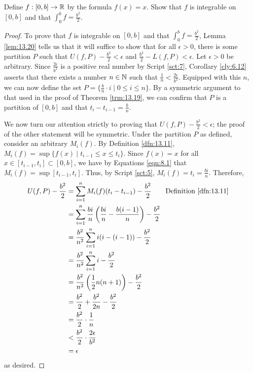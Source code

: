\documentclass[../main.tex]{subfiles}
\begin{document}
\begin{exercise}\label{exr:13.21}
    Define $f:[0,b]\to\mathbb{R}$ by the formula $f(x)=x$. Show that $f$ is integrable on $[0,b]$ and that $\int_0^bf=\frac{b^2}{2}$.
    \begin{proof}
        To prove that $f$ is integrable on $[0,b]$ and that $\int_0^bf=\frac{b^2}{2}$, Lemma \ref{lem:13.20} tells us that it will suffice to show that for all $\epsilon>0$, there is some partition $P$ such that $U(f,P)-\frac{b^2}{2}<\epsilon$ and $\frac{b^2}{2}-L(f,P)<\epsilon$. Let $\epsilon>0$ be arbitrary. Since $\frac{2\epsilon}{b^2}$ is a positive real number by Script \ref{sct:7}, Corollary \ref{cly:6.12} asserts that there exists a number $n\in\mathbb{N}$ such that $\frac{1}{n}<\frac{2\epsilon}{b^2}$. Equipped with this $n$, we can now define the set $P=\{\frac{b}{n}\cdot i\mid 0\leq i\leq n\}$. By a symmetric argument to that used in the proof of Theorem \ref{trm:13.19}, we can confirm that $P$ is a partition of $[0,b]$ and that $t_i-t_{i-1}=\frac{b}{n}$.\par
        We now turn our attention strictly to proving that $U(f,P)-\frac{b^2}{2}<\epsilon$; the proof of the other statement will be symmetric. Under the partition $P$ as defined, consider an arbitrary $M_i(f)$. By Definition \ref{dfn:13.11}, $M_i(f)=\sup\{f(x)\mid t_{i-1}\leq x\leq t_i\}$. Since $f(x)=x$ for all $x\in[t_{i-1},t_i]\subset[0,b]$, we have by Equations \ref{eqn:8.1} that $M_i(f)=\sup[t_{i-1},t_i]$. Thus, by Script \ref{sct:5}, $M_i(f)=t_i=\frac{bi}{n}$. Therefore,
        \begin{align*}
            U(f,P)-\frac{b^2}{2} &= \sum_{i=1}^nM_i(f)(t_i-t_{i-1})-\frac{b^2}{2}\tag*{Definition \ref{dfn:13.11}}\\
            &= \sum_{i=1}^n\frac{bi}{n}\left( \frac{bi}{n}-\frac{b(i-1)}{n} \right)-\frac{b^2}{2}\\
            &= \frac{b^2}{n^2}\sum_{i=1}^ni(i-(i-1))-\frac{b^2}{2}\\
            &= \frac{b^2}{n^2}\sum_{i=1}^ni-\frac{b^2}{2}\\
            &= \frac{b^2}{n^2}\left( \frac{1}{2}n(n+1) \right)-\frac{b^2}{2}\\
            &= \frac{b^2}{2}+\frac{b^2}{2n}-\frac{b^2}{2}\\
            &= \frac{b^2}{2}\cdot\frac{1}{n}\\
            &< \frac{b^2}{2}\cdot\frac{2\epsilon}{b^2}\\
            &= \epsilon
        \end{align*}
        as desired.
    \end{proof}
\end{exercise}
\end{document}
